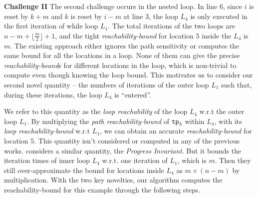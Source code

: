\textbf{Challenge II} The second challenge occurs in the nested loop.
In line 6, since $i$ is reset by $k + m$ and $k$ is reset by $i - m$ at line 3, the
loop $L_4$ is only executed in the first iteration of while loop $L_1$.
The total iterations of the two loops are
$n - m + \lfloor\frac{m}{2}\rfloor + 1$,
and the tight \emph{reachability-bound} for location $5$ inside the $L_4$ is $m$.
The existing approach either ignores the path sensitivity or computes the same bound for all the locations in a loop.
None of them can give the precise \emph{reachability-bound}s for different locations in the loop,
which is non-trivial to compute even though knowing the loop bound.
This motivates us to consider our second novel quantity --
the numbers of iterations of the outer loop $L_1$ such that,
during these iterations, the loop $L_4$ is ``entered''. 

We refer to this quantity as the \emph{loop reachability} of the loop $L_4$ w.r.t the outer loop $L_1$.
By multiplying the \emph{path reachability-bound} of $\mathtt{tp}_3$ within $L_4$,
with its \emph{loop reachability-bound} w.r.t $L_1$, we can obtain an accurate
\emph{reachability-bound} for location $5$.
This quantity isn't considered or computed in any of the previous works.
\cite{GulwaniJK09} considers a similar quantity, the \emph{Progress Invariant}. But it bounds the iteration times of inner loop $L_4$ w.r.t. one iteration of $L_1$, which is $m$. Then they still over-approximate the bound for locations inside $L_4$ as $m \times (n - m)$ by multiplication.
With the two key novelties, our algorithm computes the reachability-bound for this example through the following steps.
